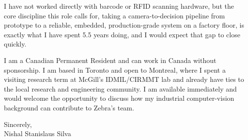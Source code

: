 \documentclass[11pt]{article}
\begin{document}
\vspace{1em}
\noindent I have not worked directly with barcode or RFID scanning hardware, but the core discipline this role calls for, taking a camera-to-decision pipeline from prototype to a reliable, embedded, production-grade system on a factory floor, is exactly what I have spent 5.5 years doing, and I would expect that gap to close quickly.

\vspace{1em}
\noindent I am a Canadian Permanent Resident and can work in Canada without sponsorship. I am based in Toronto and open to Montreal, where I spent a visiting research term at McGill's IDMIL/CIRMMT lab and already have ties to the local research and engineering community. I am available immediately and would welcome the opportunity to discuss how my industrial computer-vision background can contribute to Zebra's team.

\vspace{1em}
\noindent Sincerely, \\
Nishal Stanislaus Silva
\end{document}

